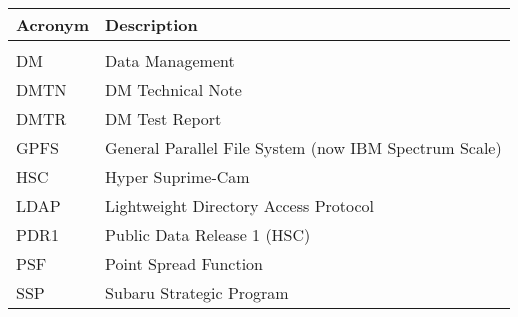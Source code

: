\addtocounter{table}{-1}
\begin{longtable}{p{}p{}}\hline
\textbf{Acronym} & \textbf{Description}  \\\hline

 &  \\\hline
DM & Data Management \\\hline
DMTN & DM Technical Note \\\hline
DMTR & DM Test Report \\\hline
GPFS & General Parallel File System (now IBM Spectrum Scale) \\\hline
HSC & Hyper Suprime-Cam \\\hline
LDAP & Lightweight Directory Access Protocol \\\hline
PDR1 & Public Data Release 1 (HSC) \\\hline
PSF & Point Spread Function \\\hline
SSP & Subaru Strategic Program \\\hline
\end{longtable}
